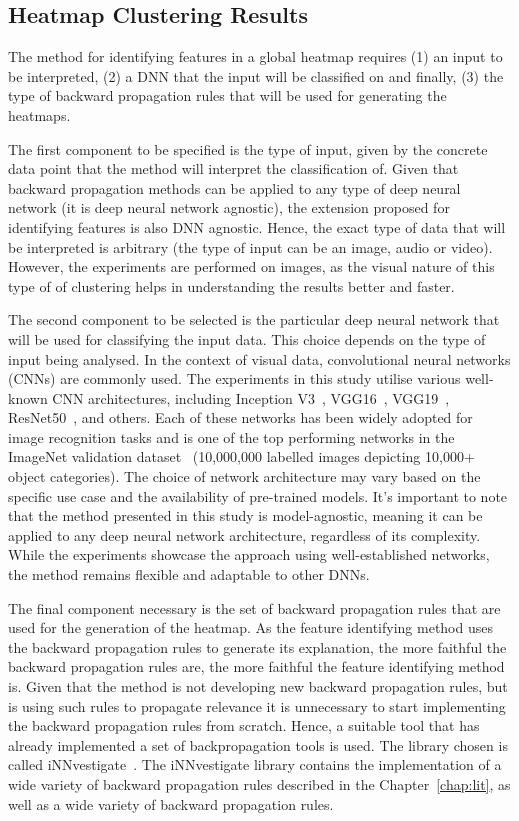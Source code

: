 \subsection{Heatmap Clustering Results}

The method for identifying features in a global heatmap requires (1) an input to be interpreted, (2) a DNN that the input will be classified on and finally, (3) the type of backward propagation rules that will be used for generating the heatmaps.

The first component to be specified is the type of input, given by the concrete data point that the method will interpret the classification of. Given that backward propagation methods can be applied to any type of deep neural network (\ie it is deep neural network agnostic), the extension proposed for identifying features is also DNN agnostic. Hence, the exact type of data that will be interpreted is arbitrary (\eg the type of input can be an image, audio or video). However, the experiments are performed on images, as the visual nature of this type of of clustering helps in understanding the results better and faster. 

The second component to be selected is the particular deep neural network that will be used for classifying the input data. This choice depends on the type of input being analysed. In the context of visual data, convolutional neural networks (CNNs) are commonly used. The experiments in this study utilise various well-known CNN architectures, including Inception V3~\cite{szegedy2015rethinking}, VGG16~\cite{simonyan2015deep}, VGG19~\cite{simonyan2015deep}, ResNet50~\cite{he2015deep}, and others. Each of these networks has been widely adopted for image recognition tasks and is one of the top performing networks in the ImageNet validation dataset~\cite{ILSVRC15} (10,000,000 labelled images depicting 10,000+ object categories). The choice of network architecture may vary based on the specific use case and the availability of pre-trained models. It's important to note that the method presented in this study is model-agnostic, meaning it can be applied to any deep neural network architecture, regardless of its complexity. While the experiments showcase the approach using well-established networks, the method remains flexible and adaptable to other DNNs.

The final component necessary is the set of backward propagation rules that are used for the generation of the heatmap. As the feature identifying method uses the backward propagation rules to generate its explanation, the more faithful the backward propagation rules are, the more faithful the feature identifying method is. Given that the method is not developing new backward propagation rules, but is using such rules to propagate relevance it is unnecessary to start implementing the backward propagation rules from scratch. Hence, a suitable tool that has already implemented a set of backpropagation tools is used. The library chosen is called iNNvestigate~\cite{inn}. The iNNvestigate library contains the implementation of a wide variety of backward propagation rules described in the Chapter~\ref{chap:lit}, as well as a wide variety of backward propagation rules.

